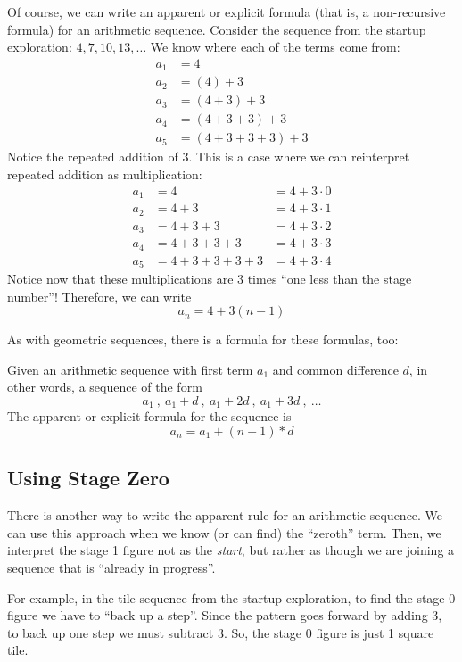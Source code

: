 Of course, we can write an apparent or explicit formula (that is, a non-recursive formula) for an arithmetic sequence. Consider the sequence from the startup exploration: $4, 7, 10, 13,\dotsc$ We know where each of the terms come from:
\[\begin{aligned}
a_1 &= 4
\\
a_2 &= (4) + 3
\\
a_3 &= (4 + 3) + 3
\\
a_4 &= (4 + 3 + 3) + 3
\\
a_5 &= (4 + 3 + 3 + 3) + 3
\end{aligned}\]
Notice the repeated addition of 3. This is a case where we can reinterpret repeated addition as multiplication:
\[\begin{aligned}
a_1 &= 4 				&= 4 + 3\cdot0 
\\
a_2 &= 4 +3			&= 4 + 3\cdot1
\\
a_3 &= 4 +3 +3			&= 4 + 3\cdot2
\\
a_4 &= 4 +3 +3 +3		&= 4 + 3\cdot3
\\
a_5 &= 4 +3 +3 +3 +3	&= 4 + 3\cdot4
\end{aligned}\]
Notice now that these multiplications are 3 times ``one less than the stage number''! Therefore, we can write \[a_n = 4 + 3 (n-1)\]

As with geometric sequences, there is a formula for these formulas, too:

\begin{boxeddef}
Given an arithmetic sequence with first term $a_1$ and common difference $d$, in other words, a sequence of the form \[a_1~,~ a_1 + d~,~ a_1 + 2d~,~ a_1 + 3d~,~ \dotsc\] The apparent or explicit formula for the sequence is \[a_n = a_1 + (n-1) \ast d\]
\end{boxeddef}

\subsection{Using Stage Zero}

There is another way to write the apparent rule for an arithmetic sequence. We can use this approach when we know (or can find) the ``zeroth'' term. Then, we interpret the stage 1 figure not as the \textit{start}, but rather as though we are joining a sequence that is ``already in progress''.

For example, in the tile sequence from the startup exploration, to find the stage 0 figure we have to ``back up a step''. Since the pattern goes forward by adding 3, to back up one step we must subtract 3. So, the stage 0 figure is just 1 square tile.

